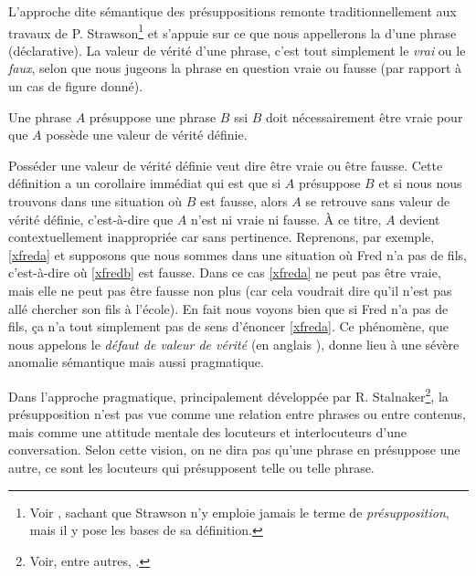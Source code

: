 \begin{refsegment}
L'approche dite sémantique des présuppositions remonte traditionnellement aux travaux de  P. Strawson\footnote{Voir \citet{Strawson:50fr}, sachant que Strawson n'y emploie jamais le terme de \emph{présupposition}, mais il y pose les bases de sa définition.}
et s'appuie sur ce que nous appellerons la  d'une phrase (déclarative).  La valeur de vérité d'une phrase, c'est tout simplement le  \emph{vrai} ou
le \emph{faux}, selon que nous jugeons la phrase en question vraie ou
fausse (par rapport à un cas de figure donné).

\begin{defi}
Une phrase $A$ présuppose une phrase $B$ ssi $B$ doit nécessairement être vraie pour que $A$ possède une valeur de vérité définie.  %
\end{defi}


Posséder une valeur de vérité définie veut dire être vraie ou être fausse.  
Cette définition a un corollaire immédiat qui est que si $A$ présuppose $B$ et si nous nous trouvons dans une situation où $B$ est fausse, alors $A$ se retrouve sans valeur de vérité définie, c'est-à-dire que $A$ n'est ni vraie ni fausse. 
À ce titre, $A$ devient contextuellement inappropriée car sans pertinence. 
Reprenons, par exemple, \ref{xfreda} et supposons que nous sommes dans une situation où Fred n'a pas de fils, c'est-à-dire où \ref{xfredb} est fausse.  
Dans ce cas \ref{xfreda} ne peut pas être vraie, mais elle ne peut pas être fausse non plus (car cela voudrait dire qu'il n'est pas allé chercher son fils à l'école).  En fait nous voyons bien que si Fred n'a pas de fils, ça n'a tout simplement pas de sens d'énoncer \ref{xfreda}. 
Ce phénomène, que nous appelons le \emph{défaut de valeur de vérité} (en anglais ),\label{p.tvgap}
donne lieu à une sévère anomalie sémantique mais aussi pragmatique.

Dans l'approche pragmatique, principalement développée par 
R. Stalnaker\footnote{Voir, entre autres, \citet{Stlnk:73,Stlnk:74}.}, la présupposition n'est pas vue comme une relation entre phrases ou entre contenus, mais comme une attitude mentale des locuteurs et interlocuteurs d'une conversation.  
Selon cette vision, on ne dira pas qu'une phrase en présuppose une autre, ce sont les locuteurs qui présupposent telle ou telle phrase. 


\end{refsegment}
